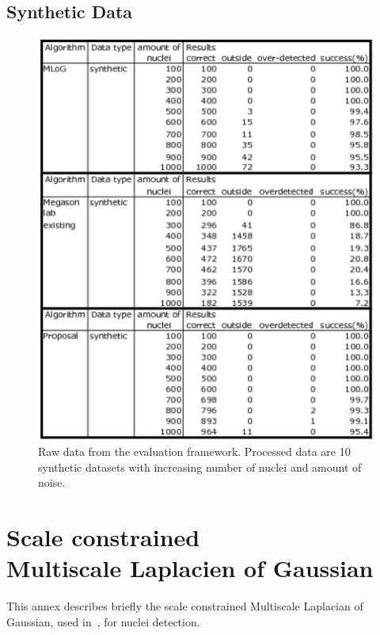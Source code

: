 \section{Synthetic Data}
\begin{figure}[H]
  \centering
  \includegraphics[width=1\textwidth]{pictures/evalTest}          
  \caption{Raw data from the evaluation framework. Processed data are 10 synthetic datasets with increasing number of nuclei and amount of noise.}
  \label{tab:syntheEvalRaw}
\end{figure}






\chapter{Scale constrained\\%
Multiscale Laplacien of Gaussian}
\label{annex:MLOG}
This annex describes briefly the scale constrained Multiscale Laplacian of Gaussian, used in~\cite{al2009improved}, for nuclei detection.

